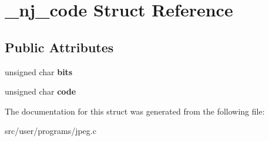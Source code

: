 \hypertarget{struct__nj__code}{}\section{\+\_\+nj\+\_\+code Struct Reference}
\label{struct__nj__code}
\subsection*{Public Attributes}
\begin{DoxyCompactItemize}
\item 
\mbox{\label{struct__nj__code_aac5b8811db82de408d43a13f06190287}} 
unsigned char {\bfseries bits}
\item 
\mbox{\label{struct__nj__code_aaa938bd21227ffa58de73e34e0f1d569}} 
unsigned char {\bfseries code}
\end{DoxyCompactItemize}


The documentation for this struct was generated from the following file\+:\begin{DoxyCompactItemize}
\item 
src/user/programs/jpeg.\+c\end{DoxyCompactItemize}

